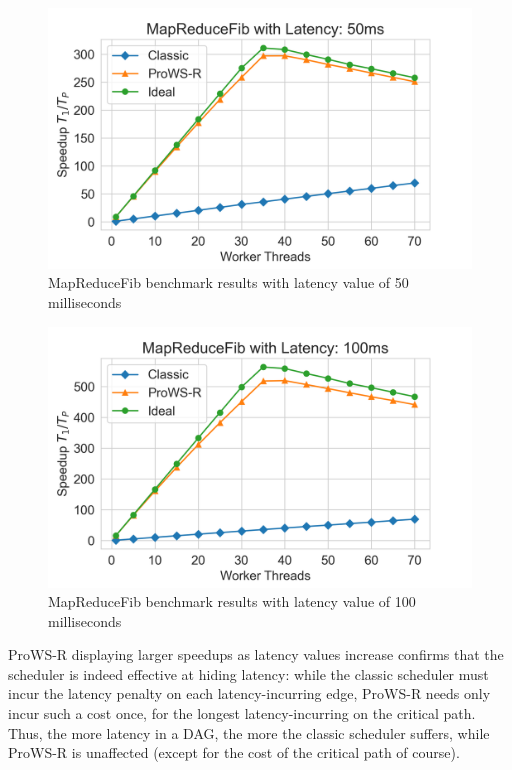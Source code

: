 \documentclass[bsc,frontabs,singlespacing,parskip,deptreport,normalheadings]{infthesis}
\begin{document}
\begin{figure}[ht]
    \centering
    \includegraphics[width=0.8\linewidth]{figures/map_reduce_plot_latency_50.png}
    \caption{MapReduceFib benchmark results with latency value of 50 milliseconds}
    \label{fig:map_reduce_plots_50ms}
\end{figure}

\begin{figure}[ht]
    \centering
    \includegraphics[width=0.8\linewidth]{figures/map_reduce_plot_latency_100.png}
    \caption{MapReduceFib benchmark results with latency value of 100 milliseconds}
    \label{fig:map_reduce_plots_100ms}
\end{figure}

ProWS-R displaying larger speedups as latency values increase confirms that the
scheduler is indeed effective at hiding latency: while the classic scheduler
must incur the latency penalty on each latency-incurring edge, ProWS-R needs
only incur such a cost once, for the longest latency-incurring on the critical
path. Thus, the more latency in a DAG, the more the classic scheduler suffers,
while ProWS-R is unaffected (except for the cost of the critical path of
course).
\end{document}
